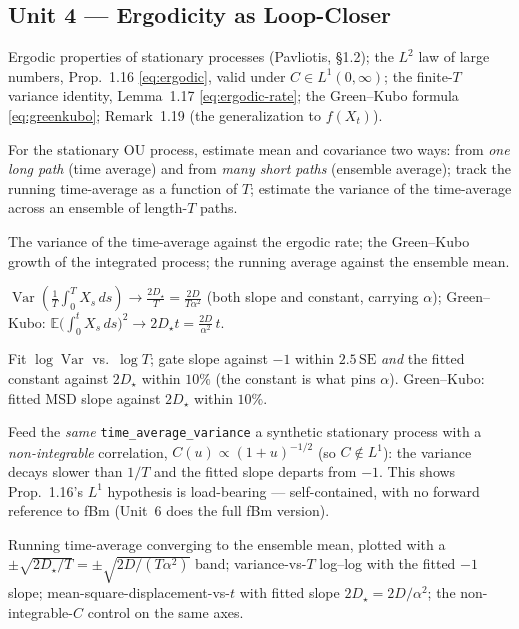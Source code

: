 \documentclass[11pt]{article}
\newcommand{\pav}[1]{{\small\color{hubblue}(Pavliotis, #1)}}
\newcommand{\Dstar}{D_{\star}}
\newenvironment{unitmeta}{%
  \begin{description}[style=sameline,leftmargin=1.4cm,font=\bfseries\color{hubblue}]
}{%
  \end{description}
}
\begin{document}
\subsection*{Unit 4 --- Ergodicity as Loop-Closer}
\begin{unitmeta}
\item[Concept] Ergodic properties of stationary processes \pav{\S1.2}; the $L^2$ law of large numbers, Prop.~1.16 \eqref{eq:ergodic}, valid under $C\in L^1(0,\infty)$; the finite-$T$ variance identity, Lemma~1.17 \eqref{eq:ergodic-rate}; the Green--Kubo formula \eqref{eq:greenkubo}; Remark~1.19 (the generalization to $f(X_t)$).
\item[Build] For the stationary OU process, estimate mean and covariance two ways: from \emph{one long path} (time average) and from \emph{many short paths} (ensemble average); track the running time-average as a function of $T$; estimate the variance of the time-average across an ensemble of length-$T$ paths.
\item[Check] The variance of the time-average against the ergodic rate; the Green--Kubo growth of the integrated process; the running average against the ensemble mean.
\item[Analytic target] $\operatorname{Var}\!\left(\frac{1}{T}\int_0^T X_s\,ds\right)\to \frac{2\Dstar}{T} = \frac{2D}{T\alpha^2}$ (both slope and constant, carrying $\alpha$); Green--Kubo: $\mathbb{E}\big(\int_0^t X_s\,ds\big)^2 \to 2\Dstar t = \frac{2D}{\alpha^2}\,t$.
\item[Pass/fail] Fit $\log\operatorname{Var}$ vs.\ $\log T$; gate slope against $-1$ within $2.5\,\mathrm{SE}$ \emph{and} the fitted constant against $2\Dstar$ within $10\%$ (the constant is what pins $\alpha$). Green--Kubo: fitted MSD slope against $2\Dstar$ within $10\%$.
\item[Negative control] Feed the \emph{same} \texttt{time\_average\_variance} a synthetic stationary process with a \emph{non-integrable} correlation, $C(u)\propto(1+u)^{-1/2}$ (so $C\notin L^1$): the variance decays slower than $1/T$ and the fitted slope departs from $-1$. This shows Prop.~1.16's $L^1$ hypothesis is load-bearing --- self-contained, with no forward reference to fBm (Unit~6 does the full fBm version).
\item[Artifact] Running time-average converging to the ensemble mean, plotted with a $\pm\sqrt{2\Dstar/T} = \pm\sqrt{2D/(T\alpha^2)}$ band; variance-vs-$T$ log--log with the fitted $-1$ slope; mean-square-displacement-vs-$t$ with fitted slope $2\Dstar = 2D/\alpha^2$; the non-integrable-$C$ control on the same axes.

\end{unitmeta}
\end{document}
